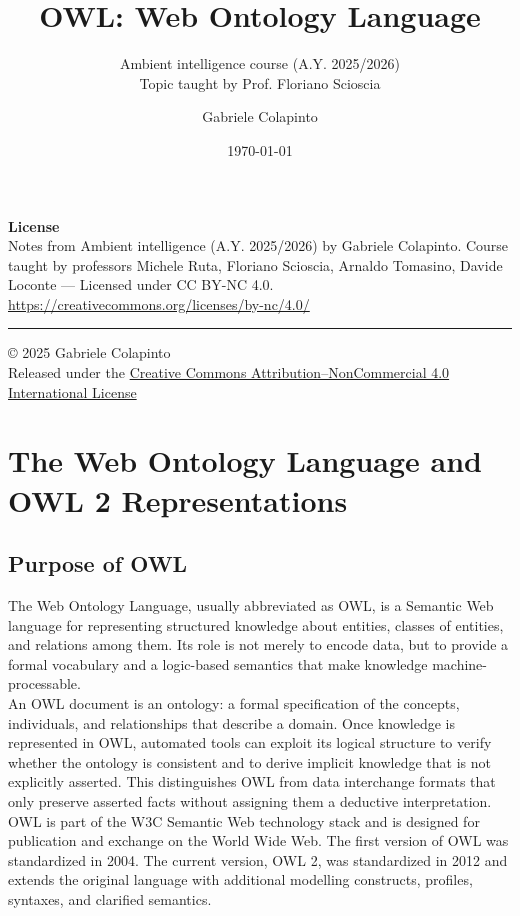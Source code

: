 \documentclass{scrbook}
\title{OWL: Web Ontology Language}
\subtitle{Ambient intelligence course (A.Y. 2025/2026)\\Topic taught by Prof. Floriano Scioscia}
\author{Gabriele Colapinto}
\date{\today}
\begin{document}
	
	\maketitle
	\thispagestyle{empty}
	
	{\Large\textbf{License}} \\
	{Notes from Ambient intelligence (A.Y. 2025/2026) by Gabriele Colapinto. 
		Course taught by professors Michele Ruta, Floriano Scioscia, Arnaldo Tomasino, Davide Loconte — 
		Licensed under CC BY-NC 4.0.\\
		\url{https://creativecommons.org/licenses/by-nc/4.0/}}
	
	\vspace*{\fill}
	\rule{\textwidth}{0.2pt}
	\small{© 2025 Gabriele Colapinto \\
		Released under the \href{https://creativecommons.org/licenses/by-nc/4.0/}{Creative Commons Attribution–NonCommercial 4.0 International License}}
	
	\clearpage
	
	\tableofcontents
	
	\chapter{The Web Ontology Language and OWL 2 Representations}
	
	\section{Purpose of OWL}
	
	The Web Ontology Language, usually abbreviated as OWL, is a Semantic Web language for representing structured knowledge about entities, classes of entities, and relations among them. Its role is not merely to encode data, but to provide a formal vocabulary and a logic-based semantics that make knowledge machine-processable.\\
	
	An OWL document is an ontology: a formal specification of the concepts, individuals, and relationships that describe a domain. Once knowledge is represented in OWL, automated tools can exploit its logical structure to verify whether the ontology is consistent and to derive implicit knowledge that is not explicitly asserted. This distinguishes OWL from data interchange formats that only preserve asserted facts without assigning them a deductive interpretation.\\
	
	OWL is part of the W3C Semantic Web technology stack and is designed for publication and exchange on the World Wide Web. The first version of OWL was standardized in 2004. The current version, OWL 2, was standardized in 2012 and extends the original language with additional modelling constructs, profiles, syntaxes, and clarified semantics.
	
\end{document}
